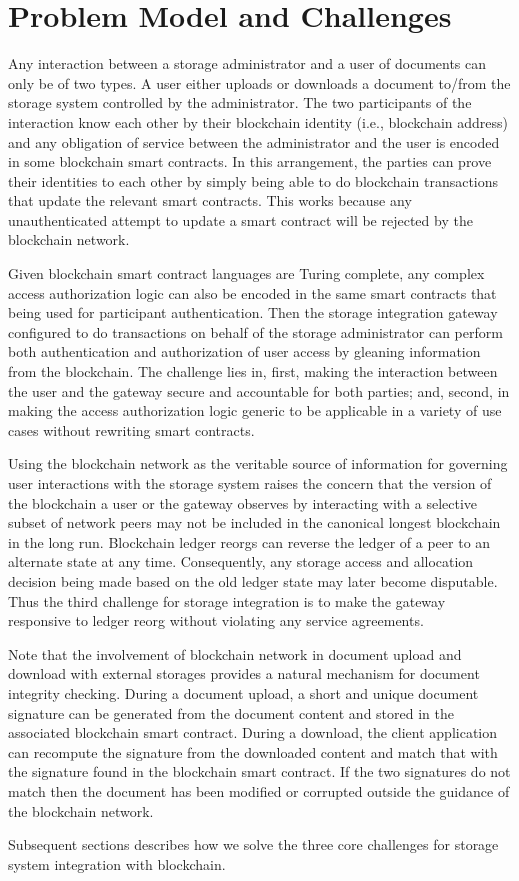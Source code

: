 \section{Problem Model and Challenges}
\label{s-scope}
Any interaction between a storage administrator and a user of documents can only be of two types. A user either uploads or downloads a document to/from the storage system controlled by the administrator. The two participants of the interaction know each other by their blockchain identity (i.e., blockchain address) and any obligation of service between the administrator and the user is encoded in some blockchain smart contracts. In this arrangement, the parties can prove their identities to each other by simply being able to do blockchain transactions that update the relevant smart contracts. This works because any unauthenticated attempt to update a smart contract will be rejected by the blockchain network.      

Given blockchain smart contract languages are Turing complete, any complex access authorization logic can also be encoded in the same smart contracts that being used for participant authentication. Then the storage integration gateway configured to do transactions on behalf of the storage administrator can perform both authentication and authorization of user access by gleaning information from the blockchain. The challenge lies in, first, making the interaction between the user and the gateway secure and accountable for both parties; and, second, in making the access authorization logic generic to be applicable in a variety of use cases without rewriting smart contracts.          

Using the blockchain network as the veritable source of information for governing user interactions with the storage system raises the concern that the version of the blockchain a user or the gateway observes by interacting with a selective subset of network peers may not be included in the canonical longest blockchain in the long run. Blockchain ledger reorgs \cite{reorg} can reverse the ledger of a peer to an alternate state at any time. Consequently, any storage access and allocation decision being made based on the old ledger state may later become disputable. Thus the third challenge for storage integration is to make the gateway responsive to ledger reorg without violating any service agreements.         

Note that the involvement of blockchain network in document upload and download with external storages provides a natural mechanism for document integrity checking. During a document upload, a short and unique document signature can be generated from the document content and stored in the associated blockchain smart contract. During a download, the client application can recompute the signature from the downloaded content and match that with the signature found in the blockchain smart contract. If the two signatures do not match then the document has been modified or corrupted outside the guidance of the blockchain network.  

Subsequent sections describes how we solve the three core challenges for storage system integration with blockchain.
